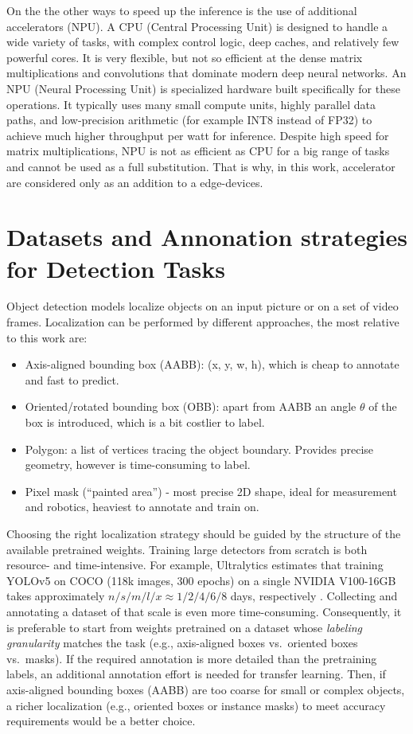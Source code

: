 \documentclass[12pt,a4paper]{report}
\begin{document}
On the the other ways to speed up the inference is the use of additional accelerators (NPU).
A CPU (Central Processing Unit) is designed to handle a wide variety of tasks, with complex control logic,
deep caches, and relatively few powerful cores. It is very flexible, but not so efficient
at the dense matrix multiplications and convolutions that dominate modern deep neural networks.
An NPU (Neural Processing Unit) is specialized hardware built specifically for these operations.
It typically uses many small compute units, highly parallel data paths, and low-precision arithmetic
(for example INT8 instead of FP32) to achieve much higher throughput per watt for inference. Despite
high speed for matrix multiplications, NPU is not as efficient as CPU for a big range of tasks and
cannot be used as a full substitution. That is why, in this work, accelerator are considered only as
an addition to a edge-devices.

\section{Datasets and Annonation strategies for Detection Tasks}
    Object detection models localize objects on an input picture or on a set of video frames.
    Localization can be performed by different approaches, the most relative to this work are:
    \begin{itemize}
        \item Axis-aligned bounding  box (AABB): (x, y, w, h), which is cheap to annotate
            and fast to predict.
        \item Oriented/rotated bounding box (OBB): apart from AABB an angle $\theta$ of
            the box is introduced,  which is a bit costlier to label.
        \item Polygon: a list of vertices tracing the object boundary. Provides precise
            geometry, however is time-consuming to label.
        \item Pixel mask (\enquote{painted area}) - most precise 2D shape, ideal for measurement
            and robotics, heaviest to annotate and train on.
    \end{itemize}

    Choosing the right localization strategy should be guided by the structure of
    the available pretrained weights. Training large detectors from scratch is
    both resource- and time-intensive. For example, Ultralytics estimates that
    training YOLOv5 on COCO (118k images, 300 epochs) on a single
    NVIDIA V100-16GB takes approximately $n/s/m/l/x \approx 1/2/4/6/8$ days,
    respectively \cite{UltralyticsYOLOv5Quickstart}. Collecting and annotating
    a dataset of that scale is even more time-consuming. Consequently,
    it is preferable to start from weights pretrained on a dataset whose
    \emph{labeling granularity} matches the task (e.g., axis-aligned boxes
    vs.\ oriented boxes vs.\ masks). If the required annotation is more
    detailed than the pretraining labels, an additional annotation
    effort is needed for transfer learning. Then, if axis-aligned bounding
    boxes (AABB) are too coarse for small or complex objects, a
    richer localization (e.g., oriented boxes or instance masks) to meet
    accuracy requirements would be a better choice.
\end{document}
